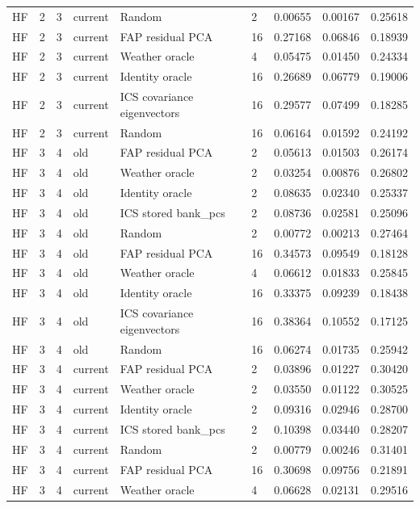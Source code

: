 \begin{tabular}{lllllllll}
HF & 2 & 3 & current & Random & 2 & 0.00655 & 0.00167 & 0.25618 \\
HF & 2 & 3 & current & FAP residual PCA & 16 & 0.27168 & 0.06846 & 0.18939 \\
HF & 2 & 3 & current & Weather oracle & 4 & 0.05475 & 0.01450 & 0.24334 \\
HF & 2 & 3 & current & Identity oracle & 16 & 0.26689 & 0.06779 & 0.19006 \\
HF & 2 & 3 & current & ICS covariance eigenvectors & 16 & 0.29577 & 0.07499 & 0.18285 \\
HF & 2 & 3 & current & Random & 16 & 0.06164 & 0.01592 & 0.24192 \\
HF & 3 & 4 & old & FAP residual PCA & 2 & 0.05613 & 0.01503 & 0.26174 \\
HF & 3 & 4 & old & Weather oracle & 2 & 0.03254 & 0.00876 & 0.26802 \\
HF & 3 & 4 & old & Identity oracle & 2 & 0.08635 & 0.02340 & 0.25337 \\
HF & 3 & 4 & old & ICS stored bank\_pcs & 2 & 0.08736 & 0.02581 & 0.25096 \\
HF & 3 & 4 & old & Random & 2 & 0.00772 & 0.00213 & 0.27464 \\
HF & 3 & 4 & old & FAP residual PCA & 16 & 0.34573 & 0.09549 & 0.18128 \\
HF & 3 & 4 & old & Weather oracle & 4 & 0.06612 & 0.01833 & 0.25845 \\
HF & 3 & 4 & old & Identity oracle & 16 & 0.33375 & 0.09239 & 0.18438 \\
HF & 3 & 4 & old & ICS covariance eigenvectors & 16 & 0.38364 & 0.10552 & 0.17125 \\
HF & 3 & 4 & old & Random & 16 & 0.06274 & 0.01735 & 0.25942 \\
HF & 3 & 4 & current & FAP residual PCA & 2 & 0.03896 & 0.01227 & 0.30420 \\
HF & 3 & 4 & current & Weather oracle & 2 & 0.03550 & 0.01122 & 0.30525 \\
HF & 3 & 4 & current & Identity oracle & 2 & 0.09316 & 0.02946 & 0.28700 \\
HF & 3 & 4 & current & ICS stored bank\_pcs & 2 & 0.10398 & 0.03440 & 0.28207 \\
HF & 3 & 4 & current & Random & 2 & 0.00779 & 0.00246 & 0.31401 \\
HF & 3 & 4 & current & FAP residual PCA & 16 & 0.30698 & 0.09756 & 0.21891 \\
HF & 3 & 4 & current & Weather oracle & 4 & 0.06628 & 0.02131 & 0.29516 \\

\end{tabular}
